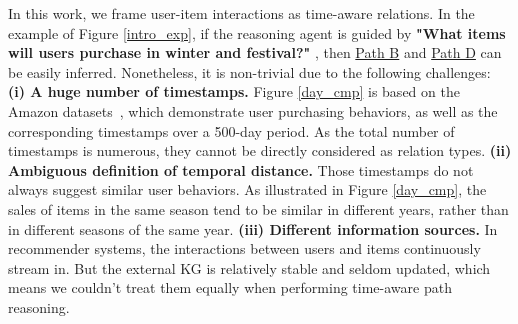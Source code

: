 In this work, we
frame user-item interactions as time-aware relations. In the example of Figure \ref{intro_exp}, if the reasoning agent is guided by  
\textbf{"What items will users purchase in winter and festival?"}
, then 
\underline{Path B} and \underline{Path D}  can be easily inferred.
Nonetheless, it is non-trivial due to 
the following challenges: 
%
\textbf{(i) A huge number of timestamps.}
Figure \ref{day_cmp} is based on the Amazon datasets~\cite{HM+2016},  which 
demonstrate user purchasing behaviors, as well as 
the corresponding timestamps over a 500-day period.
As the total number of timestamps is numerous, they cannot be directly 
considered as relation types.
%
\textbf{(ii) 	
Ambiguous definition of temporal distance.}
Those timestamps 
do not always suggest similar user behaviors.
%
As illustrated in Figure \ref{day_cmp}, 
the sales of items in the same season tend to be similar in different years,
rather than in different seasons of the same year. 
%
%
%
\textbf{(iii) Different information sources.}
In recommender systems, the interactions between users and items continuously stream in. But the external KG is relatively stable and seldom updated,
%
%
which means we couldn't treat them equally 
when performing time-aware path reasoning.



